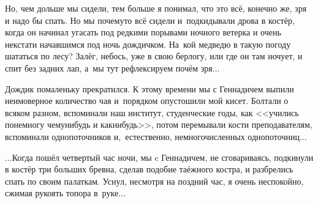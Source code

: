Но, чем дольше мы сидели, тем больше я понимал, что это всё, конечно же, зря и надо бы спать. Но мы почему\sdash то всё сидели и~подкидывали дрова в костёр, когда он начинал угасать под редкими порывами ночного ветерка и очень некстати начавшимся под ночь дождичком. На~кой медведю в такую погоду шататься по лесу? Залёг, небось, уже в свою берлогу, или где он там ночует, и спит без задних лап, а~мы тут рефлексируем почём зря$\ldots$ 

Дождик помаленьку прекратился. К этому времени мы с Геннадичем выпили неимоверное количество чая и~порядком опустошили мой кисет. Болтали о всяком разном, вспоминали наш институт, студенческие годы, как <<учились понемногу чему\sdash нибудь и как\sdash нибудь>>, потом перемывали кости преподавателям, вспоминали однопоточников и,~естественно, немногочисленных однопоточниц$\ldots$





$\ldots$Когда пошёл четвертый час ночи, мы c Геннадичем, не сговариваясь, подкинули в костёр три больших бревна, сделав подобие таёжного костра, и разбрелись спать по своим палаткам. Уснул, несмотря на поздний час, я очень неспокойно, сжимая рукоять топора в~руке$\ldots$ 

\begin{center}
\end{center}
